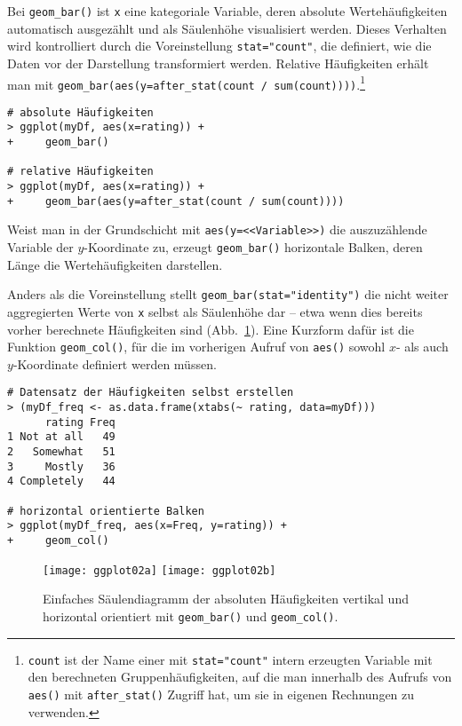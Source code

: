 Bei \lstinline!geom_bar()! ist \lstinline!x! eine kategoriale Variable, deren absolute Wertehäufigkeiten automatisch ausgezählt und als Säulenhöhe visualisiert werden. Dieses Verhalten wird kontrolliert durch die Voreinstellung \lstinline!stat="count"!, die definiert, wie die Daten vor der Darstellung transformiert werden. Relative Häufigkeiten erhält man mit \lstinline!geom_bar(aes(y=after_stat(count / sum(count))))!.\footnote{\label{ftn:ggplotCount}\lstinline!count! ist der Name einer mit \lstinline!stat="count"! intern erzeugten Variable mit den berechneten Gruppenhäufigkeiten, auf die man innerhalb des Aufrufs von \lstinline!aes()! mit \lstinline!after_stat()! Zugriff hat, um sie in eigenen Rechnungen zu verwenden.}
\begin{lstlisting}
# absolute Häufigkeiten
> ggplot(myDf, aes(x=rating)) +
+     geom_bar()

# relative Häufigkeiten
> ggplot(myDf, aes(x=rating)) +
+     geom_bar(aes(y=after_stat(count / sum(count))))
\end{lstlisting}

Weist man in der Grundschicht mit \lstinline!aes(y=<<Variable>>)! die auszuzählende Variable der $y$-Koordinate zu, erzeugt \lstinline!geom_bar()! horizontale Balken, deren Länge die Wertehäufigkeiten darstellen.

Anders als die Voreinstellung stellt \lstinline!geom_bar(stat="identity")! die nicht weiter aggregierten Werte von \lstinline!x! selbst als Säulenhöhe dar -- etwa wenn dies bereits vorher berechnete Häufigkeiten sind (Abb.\ \ref{fig:ggplot02a}). Eine Kurzform dafür ist die Funktion  \lstinline!geom_col()!, für die im vorherigen Aufruf von \lstinline!aes()! sowohl $x$- als auch $y$-Koordinate definiert werden müssen.
\begin{lstlisting}
# Datensatz der Häufigkeiten selbst erstellen
> (myDf_freq <- as.data.frame(xtabs(~ rating, data=myDf)))
      rating Freq
1 Not at all   49
2   Somewhat   51
3     Mostly   36
4 Completely   44

# horizontal orientierte Balken
> ggplot(myDf_freq, aes(x=Freq, y=rating)) +
+     geom_col()
\end{lstlisting}

\begin{figure}[ht]
\centering
\texttt{[image: ggplot02a]}
\texttt{[image: ggplot02b]}
\vspace*{-0.5em}
\caption{Einfaches Säulendiagramm der absoluten Häufigkeiten vertikal und horizontal orientiert mit \lstinline!geom_bar()! und \lstinline!geom_col()!.}
\label{fig:ggplot02a}
\end{figure}
  
